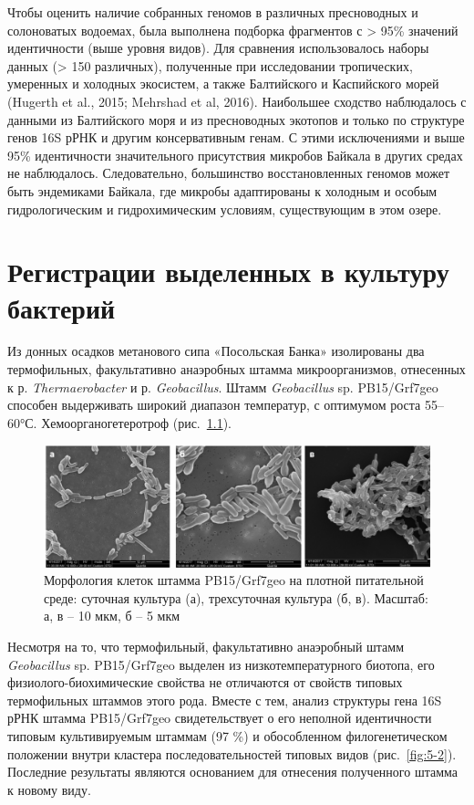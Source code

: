 \documentclass[a4paper,12pt,openany,final]{extreport}
\def\oldcaption{} \let\oldcaption=\caption
\def\caption{\stepcounter{captionsnum}\oldcaption}
\begin{document}
Чтобы оценить наличие собранных геномов в различных пресноводных и
солоноватых водоемах, была выполнена подборка фрагментов с
\textgreater{} 95\% значений идентичности (выше уровня видов). Для
сравнения использовалось наборы данных (\textgreater{} 150 различных),
полученные при исследовании тропических, умеренных и холодных экосистем,
а также Балтийского и Каспийского морей (Hugerth et al., 2015; Mehrshad
et al, 2016). Наибольшее сходство наблюдалось с данными из Балтийского
моря и из пресноводных экотопов и только по структуре генов 16S рРНК и
другим консервативным генам. С этими исключениями и выше 95\%
идентичности значительного присутствия микробов Байкала в других средах
не наблюдалось. Следовательно, большинство восстановленных геномов может
быть эндемиками Байкала, где микробы адаптированы к холодным и особым
гидрологическим и гидрохимическим условиям, существующим в этом озере.

\chapter{Регистрации выделенных в культуру бактерий}\label{chap:4}

Из донных осадков метанового сипа «Посольская Банка» изолированы два
термофильных, факультативно анаэробных штамма микроорганизмов,
отнесенных к р. \emph{Thermaerobacter} и р. \emph{Geobacillus}. Штамм
\emph{Geobacillus} sp. PB15/Grf7geo способен выдерживать широкий
диапазон температур, с оптимумом роста 55--60°С. Хемоорганогетеротроф
(рис.~\ref{fig:5-1}).

\begin{figure}[hb]\centering
\includegraphics[width=0.9\linewidth]{media/image12.png}

\caption{Морфология клеток штамма PB15/Grf7geo на плотной
питательной среде: суточная культура (а), трехсуточная культура (б, в).
Масштаб: а, в -- 10 мкм, б -- 5 мкм}\label{fig:5-1}
\end{figure}

Несмотря на то, что термофильный, факультативно анаэробный штамм
\emph{Geobacillus} sp. PB15/Grf7geo выделен из низкотемпературного
биотопа, его физиолого-биохимические свойства не отличаются от свойств
типовых термофильных штаммов этого рода. Вместе с тем, анализ структуры
гена 16S рРНК штамма PB15/Grf7geo свидетельствует о его неполной
идентичности типовым культивируемым штаммам (97 \%) и обособленном
филогенетическом положении внутри кластера последовательностей типовых
видов (рис.~\ref{fig:5-2}). Последние результаты являются основанием для отнесения
полученного штамма к новому виду.
\end{document}
